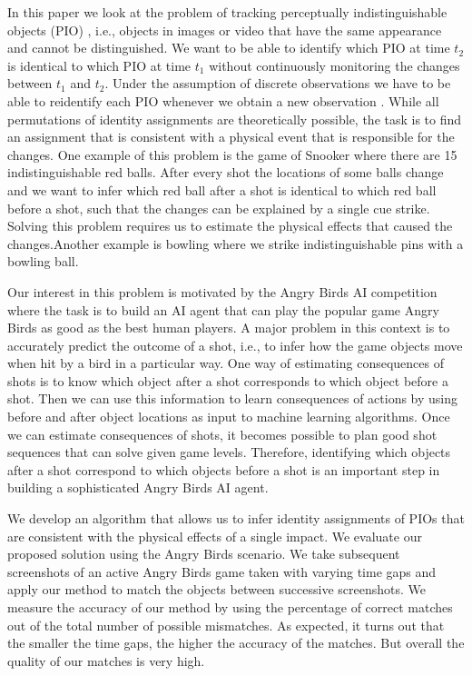 \documentclass[letterpaper]{article}
\begin{document}
In this paper we look at the problem of tracking perceptually indistinguishable objects (PIO) \cite{santore2005identifying}, i.e., objects in images or video that have the same appearance and cannot be distinguished. We want to be able to identify which PIO at time $t_2$ is identical to which PIO at time $t_1$ without continuously monitoring the changes between $t_1$ and $t_2$. Under the assumption of discrete observations we have to be able to reidentify each PIO whenever we obtain a new observation \cite{pollock74}. While all permutations of identity assignments are theoretically possible, the task is to find an assignment that is consistent with a physical event that is responsible for the changes.
One example of this problem is the game of Snooker where there are 15 indistinguishable red balls. After every shot the locations of some balls change and we want to infer which red ball after a shot is identical to which red ball before a shot, such that the changes can be explained by a single cue strike. Solving this problem requires us to estimate the physical effects that caused the changes.Another example is bowling where we strike indistinguishable pins with a bowling ball.

Our interest in this problem is motivated by the Angry Birds AI competition \cite{abCompetition} where the task is to build an AI agent that can play the popular game Angry Birds as good as the best human players. A major problem in this context is to accurately predict the outcome of a shot, i.e., to infer how the game objects move when hit by a bird in a particular way. One way of estimating consequences of shots is to know which object after a shot corresponds to which object before a shot. Then we can use this information to learn consequences of actions by using before and after object locations as input to machine learning algorithms. Once we can estimate consequences of shots, it becomes possible to plan good shot sequences that can solve given game levels. Therefore, identifying which objects after a shot correspond to which objects before a shot is an important step in building a sophisticated Angry Birds AI agent.

We develop an algorithm that allows us to infer identity assignments of PIOs that are consistent with the physical effects of a single impact. We evaluate our proposed solution using the Angry Birds scenario. We take subsequent screenshots of an active Angry Birds game taken with varying time gaps and apply our method to match the objects between successive screenshots. We measure the accuracy of our method by using the percentage of correct matches out of the total number of possible mismatches. As expected, it turns out that the smaller the time gaps, the higher the accuracy of the matches. But overall the quality of our matches is very high.
\end{document}
